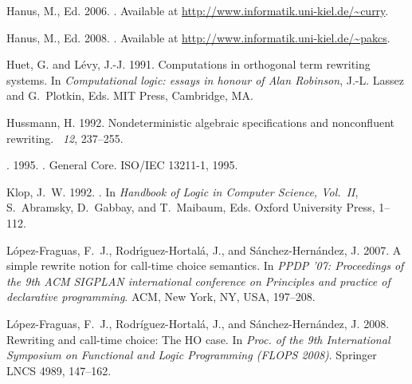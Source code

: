 \documentclass{mytlp}
\begin{document}
\begin{thebibliography}{}
{\sc Hanus, M.}, Ed. 2006.
.
\newblock Available at \url{http://www.informatik.uni-kiel.de/~curry}.

{\sc Hanus, M.}, Ed. 2008.
.
\newblock Available at \url{http://www.informatik.uni-kiel.de/~pakcs}.

{\sc Huet, G.} {\sc and} {\sc L\'evy, J.-J.} 1991.
\newblock Computations in orthogonal term rewriting systems.
\newblock In {\em Computational logic: essays in honour of Alan Robinson},
  {J.-L. Lassez} {and} {G.~Plotkin}, Eds. MIT Press, Cambridge, MA.

{\sc Hussmann, H.} 1992.
\newblock Nondeterministic algebraic specifications and nonconfluent rewriting.
~{\em 12}, 237--255.

{}. 1995.
.
\newblock General Core. ISO/IEC 13211-1, 1995.

{\sc Klop, J.~W.} 1992.
.
\newblock In {\em Handbook of Logic in Computer Science, Vol.\ II},
  {S.~Abramsky}, {D.~Gabbay}, {and} {T.~Maibaum}, Eds. Oxford University Press,
  1--112.

{\sc L\'{o}pez-Fraguas, F.~J.}, {\sc Rodr\'{\i}guez-Hortal\'{a}, J.}, {\sc and}
  {\sc S\'{a}nchez-Hern\'{a}ndez, J.} 2007.
\newblock A simple rewrite notion for call-time choice semantics.
\newblock In {\em PPDP '07: Proceedings of the 9th ACM SIGPLAN international
  conference on Principles and practice of declarative programming}. ACM, New
  York, NY, USA, 197--208.

{\sc L\'opez-Fraguas, F.~J.}, {\sc Rodr\'iguez-Hortal\'a, J.}, {\sc and} {\sc
  S\'anchez-Hern\'andez, J.} 2008.
\newblock Rewriting and call-time choice: The {HO} case.
\newblock In {\em Proc. of the 9th International Symposium on Functional and
  Logic Programming (FLOPS 2008)}. Springer LNCS 4989, 147--162.


\end{thebibliography}
\end{document}

